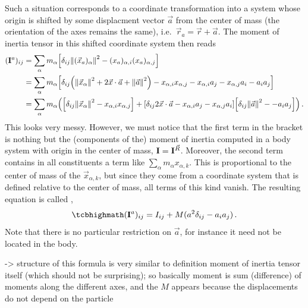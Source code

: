 \documentclass[../class_mech_main.tex]{subfiles}
\begin{document}
Such a situation corresponds to a coordinate transformation into a system whose origin is shifted by some displacment vector $\vec{a}$ from the center of mass (the orientation of the axes remains the same), i.e.~$\vec{r}_a = \vec{r} + \vec{a}$. The moment of inertia tensor in this shifted coordinate system then reads
\begin{align*}
	(\mathbf{I}^a)_{ij}
	&= \sum_\alpha m_\alpha \qty[\delta_{ij} \norm{(\vec{x}_a)_\alpha}^2 - (x_a)_{\alpha, i} (x_a)_{\alpha, j}]
	\\
	&= \sum_\alpha m_\alpha \qty[\delta_{ij} \qty(\norm{\vec{x}_\alpha}^2 + 2 \vec{x} \cdot \vec{a} + \norm{\vec{a}}^2) - x_{\alpha, i} x_{\alpha, j} - x_{\alpha, i} a_j - x_{\alpha, j} a_i - a_i a_j]
	\\
	&= \sum_\alpha m_\alpha \qty(
	\qty[\delta_{ij} \norm{\vec{x}_\alpha}^2 - x_{\alpha, i} x_{\alpha, j}] + 
	\qty[\delta_{ij} 2 \vec{x} \cdot \vec{a} - x_{\alpha, i} a_j - x_{\alpha, j} a_i]
	\qty[\delta_{ij} \norm{\vec{a}}^2 -  - a_i a_j]
	)
	\, .
\end{align*}
This looks very messy. However, we must notice that the first term in the bracket is nothing but the (components of the) moment of inertia computed in a body system with origin in the center of mass, $\mathbf{I} = \mathbf{I}^{\vec{R}}$. Moreover, the second term contains in all constituents a term like $\sum_\alpha m_\alpha x_{\alpha, k}$. This is proportional to the center of mass of the $\vec{x}_{\alpha, k}$, but since they come from a coordinate system that is defined relative to the center of mass, all terms of this kind vanish. The resulting equation is called ,
\begin{equation}\label{eq:parallel_axis_theorem}
	\eqbox{
		(\tensor{I}^a)_{ij} = I_{ij} + M (a^2 \delta_{ij} - a_i a_j)
	} \, .
\end{equation}
Note that there is no particular restriction on $\vec{a}$, for instance it need not be located in the body.

-> structure of this formula is very similar to definition moment of inertia tensor itself (which should not be surprising); so basically moment is sum (difference) of moments along the different axes, and the $M$ appears because the displacements do not depend on the particle
\end{document}

